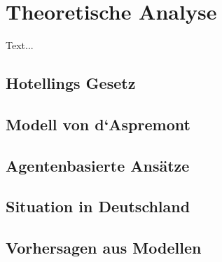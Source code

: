 \chapter{Theoretische Analyse}\label{Kap-Theorie}

\noindent
Text...

\section{Hotellings Gesetz}\label{Sec-Hotelling}

\section{Modell von d‘Aspremont}\label{Sec-Aspremont}

\section{Agentenbasierte Ansätze}\label{Sec-ABM}

\section{Situation in Deutschland}\label{Sec-Deutschland}

\section{Vorhersagen aus Modellen}\label{Sec-Vorhersagen}
